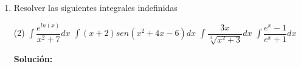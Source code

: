\documentclass[12pt]{article}
\newenvironment{solucion}
{\begin{mdframed}[backgroundcolor=black!10]
		{\bf Solución:}\\
	}
	{
	\end{mdframed}
}
\newenvironment{preguntas}
{\begin{enumerate}\itemsep12pt
	}
	{
	\end{enumerate}
}
\newcommand{\ra}{\rightarrow}
\begin{document}
\begin{preguntas}
\begin{solucion}
Notemos que podemos escribir $F(x)$ de la siguiente forma
$$F(x) =
\displaystyle\int_{1-x}^{1} \ln(t^2)dt + \displaystyle\int_{1}^{1+x} \ln(t^2)dt =
-\displaystyle\int_{1}^{1-x} \ln(t^2)dt + \displaystyle\int_{1}^{1+x} \ln(t^2)dt
$$
Luego, al derivar,
$$F'(x) = -\ln((1-x)^2)\cdot (-1) + \ln((1+x)^2)$$
Simplificando,
$$F'(x) = \ln((1-x)^2) + \ln((1+x)^2)
= \ln(((1-x)(1+x))^2)
= 2\ln(1-x^2)$$
Luego, como 
$$0 \leq x \leq \dfrac{1}{2} \ra \dfrac{3}{4} \leq 1-x^2 \leq 1$$
Concluimos que 
$$F'(x) = 2\ln(1-x^2) \leq 0$$
Por lo que la función es decreciente.
\end{solucion}
\item Resolver las siguientes integrales indefinidas
\begin{tasks}(2)
\task $\displaystyle\int \dfrac{e^{ln(x)}}{x^2+7}dx$
\task $\displaystyle\int (x+2)sen(x^2+4x-6)dx$
\task $\displaystyle\int \dfrac{3x}{\sqrt[3]{x^2+3}}dx$
\task $\displaystyle\int \dfrac{e^x-1}{e^x+1}dx$
\end{tasks}
\begin{solucion}


\end{solucion}
\end{preguntas}
\end{document}
